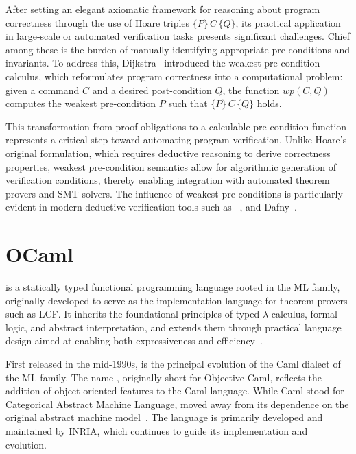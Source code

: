 After setting an elegant axiomatic framework for reasoning about program correctness through the use of Hoare triples 
$\{P\}\,C\,\{Q\}$, its practical application in large-scale or automated verification tasks presents significant challenges. 
Chief among these is the burden of manually identifying appropriate pre-conditions and invariants. To address this, 
Dijkstra~\cite{Dijkstra76} introduced the weakest pre-condition calculus, which reformulates program correctness into a computational 
problem: given a command $C$ and a desired post-condition $Q$, the function $wp(C,Q)$ computes the weakest pre-condition $P$ 
such that $\{P\}\,C\,\{Q\}$ holds.

This transformation from proof obligations to a calculable pre-condition function represents a critical step toward automating 
program verification. Unlike Hoare's original formulation, which requires deductive reasoning to derive correctness properties, 
weakest pre-condition semantics allow for algorithmic generation of verification conditions, thereby enabling integration 
with automated theorem provers and SMT solvers. The influence of weakest pre-conditions is particularly evident in modern 
deductive verification tools such as \whythree~\cite{boogie11why3}, and \textsf{Dafny}~\cite{Leino10}.

\section{OCaml}
\label{sec:OCaml}

\ocaml is a statically typed functional programming language rooted in the ML family, originally developed 
to serve as the implementation language for theorem provers such as LCF. It inherits the foundational principles 
of typed $\lambda$-calculus, formal logic, and abstract interpretation, and extends them through practical language design 
aimed at enabling both expressiveness and efficiency~\cite{FilliatrePereiraSousa2018}.

First released in the mid-1990s, \ocaml is the principal evolution of the Caml dialect of the ML family. The name \ocaml, 
originally short for Objective Caml, reflects the addition of object-oriented features to the Caml language. While Caml 
stood for Categorical Abstract Machine Language, \ocaml moved away from its dependence on the original abstract machine 
model~\cite{leroy:inria-00070049}. The language is primarily developed and maintained by INRIA, which continues to guide 
its implementation and evolution.

